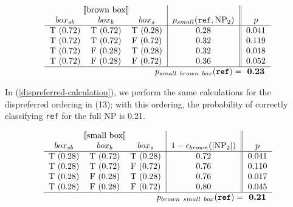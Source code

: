 \documentclass{sp}
\begin{document}
\begin{equation}
\label{default-calculation}
\begin{tabular}{ccc|c||c}	
	\multicolumn{3}{c|}{\sv{\text{brown box}}} & & \\
	$box_{sb}$ & $box_b$ & $box_s$ & $p_{small}(\texttt{ref}, \textrm{NP}_2)$ & $p$\\ \hline
	T (0.72) & T (0.72) & T (0.28) & 0.28 & 0.041 \\
	T (0.72) & T (0.72) & F (0.72) & 0.32 & 0.119 \\
	T (0.72) & F (0.28) & T (0.28) & 0.32 & 0.018 \\
	T (0.72) & F (0.28) & F (0.72) & 0.36 & 0.052 \\ \hline
	\multicolumn{4}{r}{\textbf{$p_{{small\ brown\ box}}(\texttt{ref}) = $}}\hspace{-10pt} & \textbf{0.23} \\ 
	\end{tabular}
	\end{equation}
	

In (\ref{dispreferred-calculation}), we perform the same calculations for the dispreferred ordering in (13); with this ordering, the probability of correctly classifying \texttt{ref} for the full NP is 0.21.


\begin{equation}
\label{dispreferred-calculation}
\begin{tabular}{ccc|c||c}	
\multicolumn{3}{c|}{\sv{\text{small\ box}}} & & \\
$box_{sb}$ & $box_b$ & $box_s$ & $1 - \epsilon_{brown}(|\textrm{NP}_2|)$ & $p$\\ \hline
T (0.28) & T (0.72) & T (0.28) & 0.72 & 0.041 \\
T (0.28) & T (0.72) & F (0.72) & 0.76 & 0.110 \\
T (0.28) & F (0.28) & T (0.28) & 0.76 & 0.017 \\
T (0.28) & F (0.28) & F (0.72) & 0.80 & 0.045 \\ \hline
\multicolumn{4}{r}{\textbf{$p_{{brown\ small\ box}}(\texttt{ref}) = $}}\hspace{-10pt} & \textbf{0.21} \\ 
\end{tabular}
\end{equation}
\end{document}
